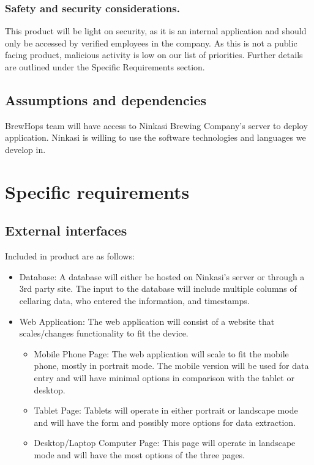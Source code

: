 \documentclass[draftclsnofoot,onecolumn,letterpaper,10pt,compsoc]{IEEEtran}
\begin{document}
		\subsubsection{Safety and security considerations.}
		This product will be light on security, as it is an internal application and should only be accessed by verified employees in the company.
		As this is not a public facing product, malicious activity is low on our list of priorities.
		Further details are outlined under the Specific Requirements section.

	\subsection{Assumptions and dependencies}
    BrewHops team will have access to Ninkasi Brewing Company's server to deploy application.
    Ninkasi is willing to use the software technologies and languages we develop in.

\section{Specific requirements}
	\subsection{External interfaces}
    Included in product are as follows:
        \begin{itemize}
				\item{Database: A database will either be hosted on Ninkasi's server or through a 3rd party site.
                The input to the database will include multiple columns of cellaring data, who entered the information, and timestamps. }

            \item{Web Application:}
            The web application will consist of a website that scales/changes functionality to fit the device.

                \begin{itemize}
				    \item{Mobile Phone Page: The web application will scale to fit the mobile phone, mostly in portrait mode.
					The mobile version will be used for data entry and will have minimal options in comparison with the tablet or desktop.}

                    \item{Tablet Page: Tablets will operate in either portrait or landscape mode and will have the form and possibly more options for data extraction.}

                    \item{Desktop/Laptop Computer Page: This page will operate in landscape mode and will have the most options of the three pages.}

                \end{itemize}
        \end{itemize}
\end{document}
